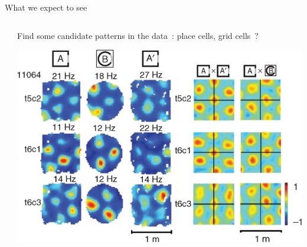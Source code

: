 \documentclass[bigger]{beamer}
\begin{document}
\begin{frame}[label={sec:orgcd13342}]{What we expect to see}
\begin{columns}
\begin{column}{0.5\columnwidth}
\end{column}
\begin{column}{0.5\columnwidth}
\center
\scriptsize
Find some candidate patterns in the data~: place cells, grid cells~?
\normalsize
\begin{center}
\includegraphics[height=0.25\textheight]{img/place-cells-grid-cells.jpg.png}
\end{center}


\end{column}
\end{columns}
\end{frame}
\end{document}
